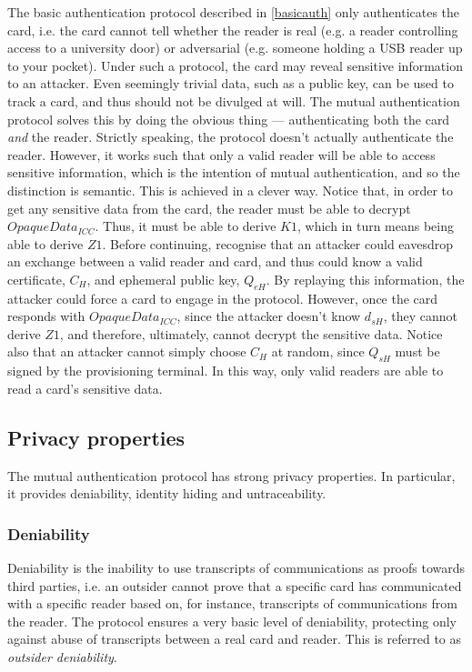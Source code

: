 \documentclass[12pt,a4paper,twoside,openright]{report}
\begin{document}
The basic authentication protocol described in \autoref{basicauth} only authenticates the card, i.e. the card cannot tell whether the reader is real (e.g. a reader controlling access to a university door) or adversarial (e.g. someone holding a USB reader up to your pocket). Under such a protocol, the card may reveal sensitive information to an attacker. Even seemingly trivial data, such as a public key, can be used to track a card, and thus should not be divulged at will. The mutual authentication protocol solves this by doing the obvious thing --- authenticating both the card \emph{and} the reader. Strictly speaking, the protocol doesn't actually authenticate the reader. However, it works such that only a valid reader will be able to access sensitive information, which is the intention of mutual authentication, and so the distinction is semantic. This is achieved in a clever way. Notice that, in order to get any sensitive data from the card, the reader must be able to decrypt $OpaqueData_{ICC}$. Thus, it must be able to derive $K1$, which in turn means being able to derive $Z1$. Before continuing, recognise that an attacker could eavesdrop an exchange between a valid reader and card, and thus could know a valid certificate, $C_{H}$, and ephemeral public key, $Q_{eH}$. By replaying this information, the attacker could force a card to engage in the protocol. However, once the card responds with $OpaqueData_{ICC}$, since the attacker doesn't know $d_{sH}$, they cannot derive $Z1$, and therefore, ultimately, cannot decrypt the sensitive data. Notice also that an attacker cannot simply choose $C_{H}$ at random, since $Q_{sH}$ must be signed by the provisioning terminal. In this way, only valid readers are able to read a card's sensitive data.

\subsection{Privacy properties}

The mutual authentication protocol has strong privacy properties. In particular, it provides deniability, identity hiding and untraceability.

\subsubsection{Deniability}

Deniability is the inability to use transcripts of communications as proofs towards third parties, i.e. an outsider cannot prove that a specific card has communicated with a specific reader based on, for instance, transcripts of communications from the reader. The protocol ensures a very basic level of deniability, protecting only against abuse of transcripts between a real card and reader. This is referred to as \emph{outsider deniability}.
\end{document}
